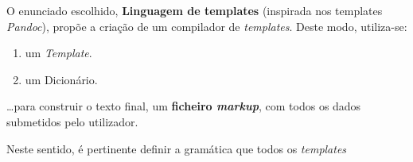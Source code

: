 \documentclass[../relatorio.tex]{subfiles}
\begin{document}
O enunciado escolhido, \textbf{Linguagem de templates} (inspirada nos templates \textit{Pandoc}),
propõe a criação de um compilador de \textit{templates}.
Deste modo, utiliza-se:
\begin{enumerate}
    \item um \textit{Template}.
    \item um Dicionário.
\end{enumerate}
\dots para construir o texto final, um \textbf{ficheiro \textit{markup}}, 
com todos os dados submetidos pelo utilizador.  

Neste sentido, é pertinente definir a gramática que todos 
os \textit{templates}


\end{document}
